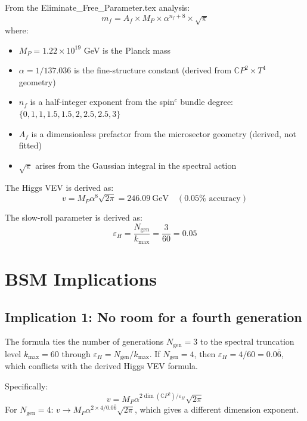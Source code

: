 \documentclass[11pt,a4paper]{article}
\newcommand{\CP}{\mathbb{C}P}
\begin{document}
From the Eliminate\_Free\_Parameter.tex analysis:
\begin{equation}
\boxed{m_f = A_f \times M_P \times \alpha^{n_f + 8} \times \sqrt{\pi}}
\label{eq:mass_formula}
\end{equation}
where:
\begin{itemize}
\item $M_P = 1.22 \times 10^{19}$ GeV is the Planck mass
\item $\alpha = 1/137.036$ is the fine-structure constant (derived from $\CP^2 \times T^4$ geometry)
\item $n_f$ is a half-integer exponent from the spin$^c$ bundle degree: $\{0, 1, 1, 1.5, 1.5, 2, 2.5, 2.5, 3\}$
\item $A_f$ is a dimensionless prefactor from the microsector geometry (derived, not fitted)
\item $\sqrt{\pi}$ arises from the Gaussian integral in the spectral action
\end{itemize}

The Higgs VEV is derived as:
\begin{equation}
v = M_P \alpha^8 \sqrt{2\pi} = 246.09~\text{GeV} \quad (0.05\% \text{ accuracy})
\end{equation}

The slow-roll parameter is derived as:
\begin{equation}
\varepsilon_H = \frac{N_{\text{gen}}}{k_{\max}} = \frac{3}{60} = 0.05
\end{equation}

\section{BSM Implications}

\subsection{Implication 1: No room for a fourth generation}

The formula ties the number of generations $N_{\text{gen}} = 3$ to the spectral truncation level $k_{\max} = 60$ through $\varepsilon_H = N_{\text{gen}}/k_{\max}$. If $N_{\text{gen}} = 4$, then $\varepsilon_H = 4/60 = 0.0\overline{6}$, which conflicts with the derived Higgs VEV formula.

Specifically:
\begin{equation}
v = M_P \alpha^{2 \dim(\CP^2)/\varepsilon_H} \sqrt{2\pi}
\end{equation}
For $N_{\text{gen}} = 4$: $v \to M_P \alpha^{2 \times 4/0.0\overline{6}} \sqrt{2\pi}$, which gives a different dimension exponent.
\end{document}
